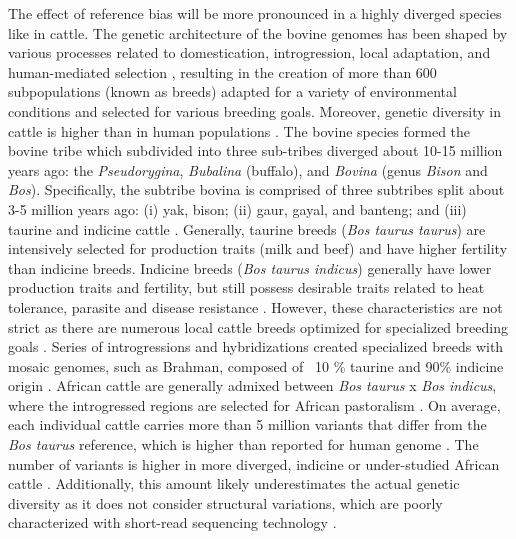 \documentclass[../main.tex]{subfiles}
\begin{document}
The effect of reference bias will be more pronounced in a highly diverged species like in cattle. The genetic architecture of the bovine genomes has been shaped by various processes related to domestication, introgression, local adaptation, and human-mediated selection \citep{zhang2020evolution}, resulting in the creation of more than 600 subpopulations (known as breeds) adapted for a variety of environmental conditions and selected for various breeding goals. Moreover, genetic diversity in cattle is higher than in human populations \citep{charlier2016ngs}. The bovine species formed the bovine tribe which subdivided into three sub-tribes diverged about 10-15 million years ago: the \emph{Pseudorygina}, \emph{Bubalina} (buffalo), and \emph{Bovina} (genus \emph{Bison} and \emph{Bos}). Specifically, the subtribe bovina is comprised of three subtribes split about 3-5 million years ago: (i) yak, bison; (ii) gaur, gayal, and banteng; and (iii) taurine and indicine cattle \citep{pitt2019domestication}. Generally, taurine breeds (\emph{Bos taurus taurus}) are intensively selected for production traits (milk and beef) and have higher fertility than indicine breeds. Indicine breeds (\emph{Bos taurus indicus}) generally have lower production traits and fertility, but still possess desirable traits related to heat tolerance, parasite and disease resistance \citep{Low2020}. However, these characteristics are not strict as there are numerous local cattle breeds optimized for specialized breeding goals \citep{signer2017population,upadhyay2019genomic}. Series of introgressions and hybridizations created specialized breeds with mosaic genomes, such as Brahman, composed of ~10 \% taurine and 90\% indicine origin \citep{koufariotis2018sequencing}. African cattle are generally admixed between \emph{Bos taurus} x \emph{Bos indicus}, where the introgressed regions are selected for African pastoralism \citep{kim2020mosaic}. On average, each individual cattle carries more than 5 million variants that differ from the \emph{Bos taurus} reference, which is higher than reported for human genome \citep{daetwyler2014whole,sudmant2015integrated}. The number of variants is higher in more diverged, indicine \citep{koufariotis2018sequencing} or under-studied African cattle \citep{kim2020mosaic,kim2017genome}. Additionally, this amount likely underestimates the actual genetic diversity as it does not consider structural variations, which are poorly characterized with short-read sequencing technology \citep{mahmoud2019structural,chaisson2019multi}. 
\end{document}
